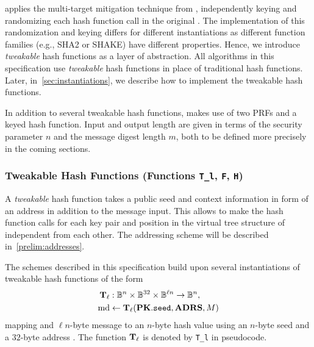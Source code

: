   \spx applies the multi-target mitigation technique from
   \cite{Huelsing2016}, independently keying and randomizing each hash function
   call in the original \spc. The implementation of this randomization and
   keying differs for different instantiations as different function families
   (e.g., SHA2 or SHAKE) have different properties. Hence, we introduce
   \emph{tweakable} hash functions as a layer of abstraction. All algorithms in
   this specification use \emph{tweakable} hash functions in place of traditional
   hash functions. Later, in~\autoref{sec:instantiations}, we describe how to
   implement the tweakable hash functions.

   In addition to several tweakable hash functions, \spx makes use of two PRFs
   and a keyed hash function. Input and output length are given in terms of the
   security parameter $n$ and the message digest length $m$, both to be defined
   more precisely in the coming sections.

\subsubsection{Tweakable Hash Functions (Functions \texttt{T\_l}, \texttt{F}, \texttt{H})}
   A \emph{tweakable} hash function takes a public seed \pseed and context
   information in form of an address \adrs in addition to the message input.
   This allows to make the hash function calls for each
   key pair and position in the virtual tree structure of \spx independent from
   each other. The addressing scheme will be described in~\autoref{prelim:addresses}.

   The schemes described in this specification build upon several instantiations
   of tweakable hash functions of the form
   \begin{align*}
     \mathbf{T}_\ell &: \mathbb{B}^n \times \mathbb{B}^{32} \times \mathbb{B}^{\ell n} \to \mathbb{B}^n, \\
     \textrm{md} &\leftarrow \mathbf{T}_\ell(\mathbf{PK}.\texttt{seed}, \textbf{ADRS}, M)
   \end{align*}
   mapping and $\ell n$-byte message \msg to an
   $n$-byte hash value \md using an $n$-byte seed \pseed and a $32$-byte address \adrs.
   The function $\mathbf{T}_\ell$ is denoted by \texttt{T\_l} in pseudocode.


